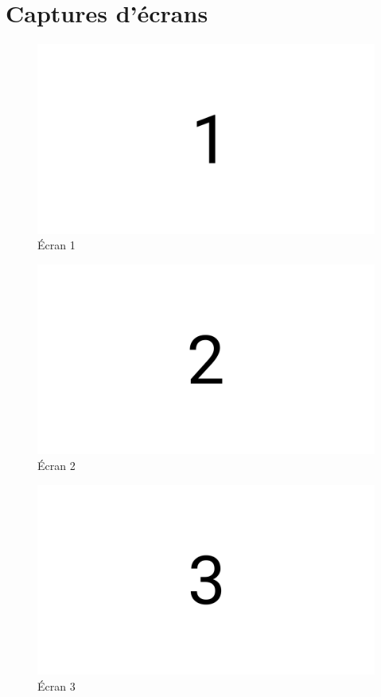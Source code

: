 \section{Captures d’écrans}

\begin{figure}[H]
    \centering
    \includegraphics[width=6in]{img/1}
    \caption{Écran 1}
\end{figure}

\begin{figure}[H]
    \centering
    \includegraphics[width=6in]{img/2}
    \caption{Écran 2}
\end{figure}

\begin{figure}[H]
    \centering
    \includegraphics[width=6in]{img/3}
    \caption{Écran 3}
\end{figure}

